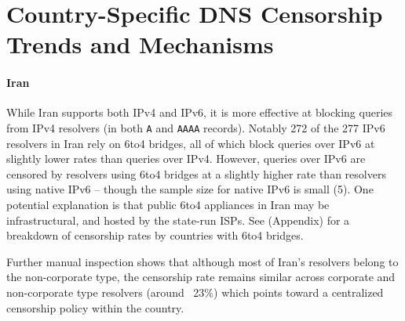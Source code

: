 \section{Country-Specific DNS Censorship Trends and Mechanisms}
\label{sec:cases}

% 

\paragraph{Iran}
While Iran supports both IPv4 and IPv6, it is more effective at blocking queries
from IPv4 resolvers (in both \texttt{A} and \texttt{AAAA} records). Notably 272
of the 277 IPv6 resolvers in Iran rely on 6to4 bridges, all of which block
queries over IPv6 at slightly lower rates than queries over IPv4. However,
queries over IPv6 are censored by resolvers using 6to4 bridges at a slightly
higher rate than resolvers using native IPv6 -- though the sample size for
native IPv6 is small (5). One potential explanation is that public 6to4
appliances in Iran may be infrastructural, and hosted by the state-run ISPs. See
 (Appendix) for a breakdown of censorship
rates by countries with 6to4 bridges.

Further manual inspection shows that although most of Iran's resolvers belong
to the non-corporate type, the censorship rate remains similar across
corporate and non-corporate type resolvers (around ~23\%) which points toward a
centralized censorship policy within the country.


